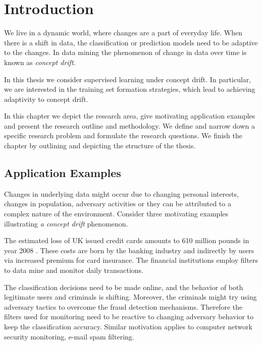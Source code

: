 \chapter{Introduction}
\label{cha:intro}

We live in a dynamic world, where changes are a part of everyday life.
When there is a shift in data, the classification or prediction models need to be adaptive to the changes.
In data mining the phenomenon of change in data over time is known as \emph{concept drift}.


In this thesis we consider supervised learning under concept drift. In particular, we are interested in the training set formation strategies, which lead to achieving adaptivity to concept drift.

In this chapter we depict the research area, give motivating application examples and present the research outline and methodology. We define and narrow down a specific research problem and formulate the research questions.
We finish the chapter by outlining and depicting the structure of the thesis.

\section{Application Examples}

Changes in underlying data might occur due to changing personal interests, changes in population, adversary activities or they can be attributed to a complex nature of the environment.
Consider three motivating examples illustrating \emph{a concept drift} phenomenon.

\begin{example} 
\label{exa:fraud}
The estimated loss of UK issued credit cards amounts to 610 million pounds in year 2008 \cite{cardwatch}. These costs are born by the banking industry and indirectly by users via increased premium for card insurance. The financial institutions employ filters to data mine and monitor daily transactions.

The classification decisions need to be made online, and the behavior of both legitimate users and criminals is shifting. Moreover, the criminals might try using adversary tactics to overcome the fraud detection mechanisms. Therefore the filters used for monitoring need to be reactive to changing adversary behavior to keep the classification accuracy. Similar motivation applies to computer network security monitoring, e-mail spam filtering.
\end{example}


